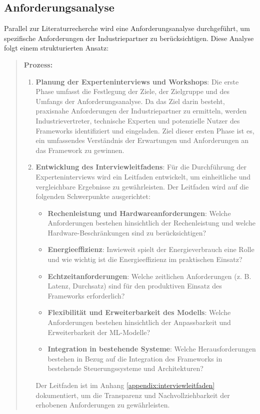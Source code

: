 \subsection{Anforderungsanalyse}

Parallel zur Literaturrecherche wird eine Anforderungsanalyse durchgeführt, um spezifische Anforderungen der Industriepartner zu berücksichtigen. Diese Analyse folgt einem strukturierten Ansatz:
\begin{quote}
\textbf{Prozess:}
\begin{enumerate}
    \item \textbf{Planung der Experteninterviews und Workshops}: Die erste Phase umfasst die Festlegung der Ziele, der Zielgruppe und des Umfangs der Anforderungsanalyse. Da das Ziel darin besteht, praxisnahe Anforderungen der Industriepartner zu ermitteln, werden Industrievertreter, technische Experten und potenzielle Nutzer des Frameworks identifiziert und eingeladen. Ziel dieser ersten Phase ist es, ein umfassendes Verständnis der Erwartungen und Anforderungen an das Framework zu gewinnen.
    \item \textbf{Entwicklung des Interviewleitfadens}: Für die Durchführung der Experteninterviews wird ein Leitfaden entwickelt, um einheitliche und vergleichbare Ergebnisse zu gewährleisten. Der Leitfaden wird auf die folgenden Schwerpunkte ausgerichtet:
    \begin{itemize}
        \item \textbf{Rechenleistung und Hardwareanforderungen}: Welche Anforderungen bestehen hinsichtlich der Rechenleistung und welche Hardware-Beschränkungen sind zu berücksichtigen?
        \item \textbf{Energieeffizienz}: Inwieweit spielt der Energieverbrauch eine Rolle und wie wichtig ist die Energieeffizienz im praktischen Einsatz?
        \item \textbf{Echtzeitanforderungen}: Welche zeitlichen Anforderungen (z. B. Latenz, Durchsatz) sind für den produktiven Einsatz des Frameworks erforderlich?
        \item \textbf{Flexibilität und Erweiterbarkeit des Modells}: Welche Anforderungen bestehen hinsichtlich der Anpassbarkeit und Erweiterbarkeit der ML-Modelle?
        \item \textbf{Integration in bestehende Systeme}: Welche Herausforderungen bestehen in Bezug auf die Integration des Frameworks in bestehende Steuerungssysteme und Architekturen?
    \end{itemize}
    Der Leitfaden ist im Anhang \ref{appendix:interviewleitfaden} dokumentiert, um die Transparenz und Nachvollziehbarkeit der erhobenen Anforderungen zu gewährleisten. 


\end{enumerate}
\end{quote}
